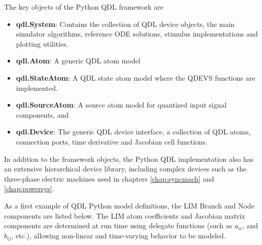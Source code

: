 The key objects of the Python QDL framework are

\begin{itemize}
    \item{\textbf{qdl.System}: Contains the collection of QDL device objects, the main simulator algorithms, reference ODE solutions, stimulus implementations and plotting utilities.}
    \item{\textbf{qdl.Atom}: A generic QDL atom model}
    \item{\textbf{qdl.StateAtom}: A QDL state atom model where the QDEVS functions are implemented.}
    \item{\textbf{qdl.SourceAtom}: A source atom model for quantized input signal components, and}
    \item{\textbf{qdl.Device}: The generic QDL device interface, a collection of QDL atoms, connection ports, time derivative and Jacobian cell functions.}
\end{itemize}

In addition to the framework objects, the Python QDL implementation also has an extensive hierarchical device library, including complex devices such as the three-phase electric machines used in chapters \ref{chap:syncmach} and \ref{chap:powersys}.

As a first example of QDL Python model definitions, the LIM Branch and Node components are listed below. The LIM atom coefficients and Jacobian matrix components are determined at run time using delegate functions (such as $a_{ii}$, and $b_{ij}$, etc.), allowing non-linear and time-varying behavior to be modeled.

\bigskip 

